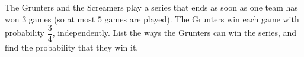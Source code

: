 The Grunters and the Screamers play a series that ends as soon as one team has won \(3\) games (so at most \(5\) games are played). The Grunters win each game with probability \(\dfrac{3}{4}\), independently. List the ways the Grunters can win the series, and find the probability that they win it.
